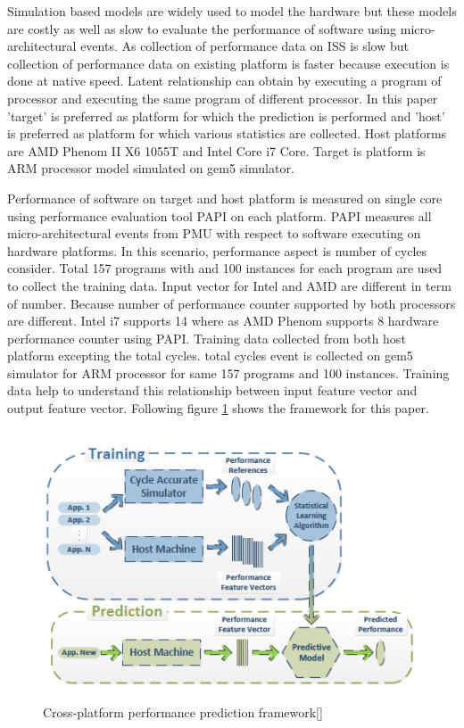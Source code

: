 \par Simulation based models are widely used to model the hardware but these models are costly as well as slow to evaluate the performance of software using micro-architectural events. As collection of performance data on ISS is slow but collection of performance data on existing platform is faster because execution is done at native speed. Latent relationship can obtain by executing a program of processor and executing the same program of different processor. In this paper 'target' is preferred as platform for which the prediction is performed and 'host' is preferred as platform for which various statistics are collected. Host platforms are AMD Phenom II X6 1055T and Intel Core i7 Core. Target is platform is ARM processor model simulated on gem5 simulator.  

\par Performance of software on target and host platform is measured on single core using performance evaluation tool PAPI on each platform. PAPI measures all micro-architectural events from PMU with respect to software executing on hardware platforms. In this scenario, performance aspect is number of cycles consider. Total 157 programs with and 100 instances for each program are used to collect the training data. Input vector for Intel and AMD are different in term of number. Because number of performance counter supported by both processors are different. Intel i7 supports 14 where as AMD Phenom supports 8 hardware performance counter using PAPI. Training data collected from both host platform excepting the total cycles. total cycles event is collected on gem5 simulator for ARM processor for same 157 programs and 100 instances. Training data help to understand this relationship between input feature vector and output feature vector. Following figure \ref{fig:paper1} shows the framework for this paper. 

\begin{figure}[h!]
\includegraphics[width=12cm, height=8cm]{./images/ieee1}
\centering
\caption{Cross-platform performance prediction framework[]}
\label{fig:paper1}
\end{figure} 

